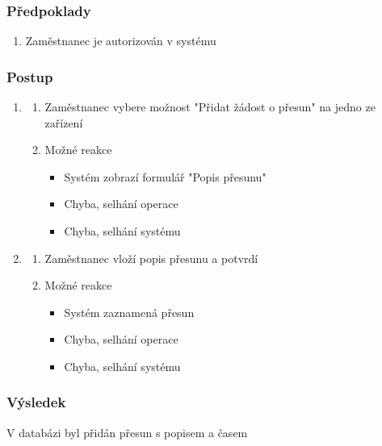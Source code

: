 \documentclass[a4paper,11pt]{article}
\begin{document}
	\subsubsection*{Předpoklady}
	\begin{enumerate}
	    \item Zaměstnanec je autorizován v systému
	\end{enumerate}
	\subsubsection*{Postup}
	\begin{enumerate}
	    \item 
		\begin{enumerate}[label={\Alph*})]
		    \item Zaměstnanec vybere možnost "Přidat žádost o přesun" na jedno ze zařízení 
		    \item Možné reakce
			\begin{itemize}
			    \item Systém zobrazí formulář "Popis přesunu"
			    \item Chyba, selhání operace
			    \item Chyba, selhání systému
			\end{itemize}
		\end{enumerate}
		\item
		\begin{enumerate}[label={\Alph*})]
			\item Zaměstnanec vloží popis přesunu a potvrdí
			\item Možné reakce
			\begin{itemize}
				\item Systém zaznamená přesun
				\item Chyba, selhání operace
				\item Chyba, selhání systému
			\end{itemize}
		\end{enumerate}
	\end{enumerate}
	\subsubsection*{Výsledek}
	V databázi byl přidán přesun s popisem a časem	
\end{document}
